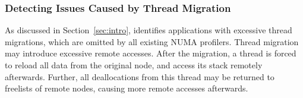 


\subsubsection{Detecting Issues Caused by Thread Migration}

As discussed in Section~\ref{sec:intro}, \NP{} identifies applications with excessive thread migrations, which are omitted by all existing NUMA profilers. 
Thread migration may introduce excessive remote accesses. After the migration, a thread is forced to reload all data from the original node, and access its stack remotely afterwards. Further, all deallocations from this thread may be returned to freelists of remote nodes, causing more remote accesses afterwards.    

